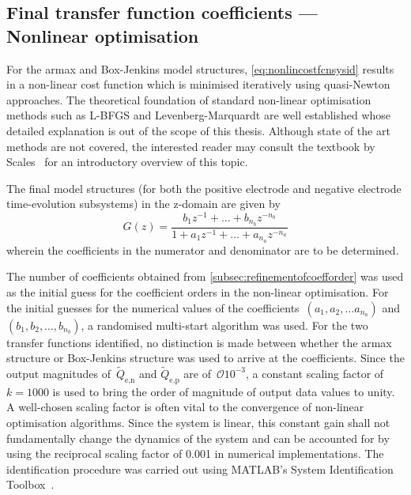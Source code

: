 \subsection{Final transfer function coefficients --- Nonlinear optimisation}

For         the         \gls{armax}        and         Box-Jenkins         model
structures, \cref{eq:nonlincostfcnsysid} results  in a non-linear  cost function
which  is  minimised iteratively  using  quasi-Newton  approaches. The  theoretical
foundation  of  standard non-linear  optimisation  methods  such as  L-BFGS  and
Levenberg-Marquardt are  well established whose  detailed explanation is  out of
the scope of this thesis. Although state of the art methods are not covered, the
interested reader  may consult the  textbook by Scales~\cite{Scales1985}  for an
introductory overview of this topic.

The  final  model structures  (for  both  the  positive electrode  and  negative
electrode time-evolution subsystems) in the z-domain are given by
\begin{equation}
    G(z) = \frac{b_1z^{-1} + \dots + b_{n_b}z^{-{n_b}}}{1 + a_1z^{-1} + \dots + a_{n_a}z^{-{n_a}}}\label{eq:genericZtf}
\end{equation}
wherein the coefficients in the numerator and denominator are to be determined.

The  number of  coefficients obtained  from \cref{subsec:refinementofcoefforder}
was  used as  the initial  guess for  the coefficient  orders in  the non-linear
optimisation.  For  the  initial  guesses   for  the  numerical  values  of  the
coefficients~$(a_1, a_2,  \dots a_{n_a})$ and ${(b_1, b_2, \dots  , b_{n_b} )}$, a
randomised  multi-start  algorithm was  used.  For  the two  transfer  functions
identified, no distinction is made  between whether the \gls{armax} structure or
Box-Jenkins structure was  used to arrive at the coefficients.  Since the output
magnitudes of~$\widetilde{Q}_{\text{e,n}}$  and $\widetilde{Q}_{\text{e,p}}$ are
of~$\mathcal{O}{10^{-3}}$,  a  constant  scaling   factor  of~${k  =  1000}$  is
used  to  bring the  order  of  magnitude of  output  data  values to  unity.  A
well-chosen  scaling factor  is often  vital  to the  convergence of  non-linear
optimisation algorithms.  Since the system  is linear, this constant  gain shall
not fundamentally change the dynamics of the  system and can be accounted for by
using the reciprocal  scaling factor of 0.001 in  numerical implementations. The
identification procedure  was carried  out using MATLAB's  System Identification
Toolbox~\cite{matlabsysidtool}.


